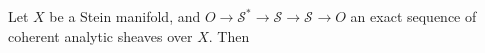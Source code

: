 Let $X$ be a Stein manifold, and $O \rightarrow \mathcal{S}^* \rightarrow \mathcal{S} \rightarrow \mathcal{S}^{} \rightarrow O$ an exact sequence of coherent analytic sheaves over $X$. Then
